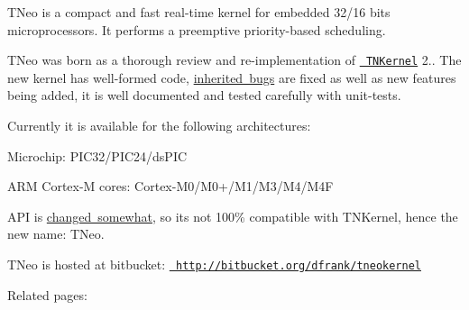 T\+Neo is a compact and fast real-\/time kernel for embedded 32/16 bits microprocessors. It performs a preemptive priority-\/based scheduling.

T\+Neo was born as a thorough review and re-\/implementation of \href{http://tnkernel.com}{\texttt{ T\+N\+Kernel}} 2.. The new kernel has well-\/formed code, \mbox{\hyperlink{why_reimplement_why_reimplement__bugs}{inherited bugs}} are fixed as well as new features being added, it is well documented and tested carefully with unit-\/tests.

Currently it is available for the following architectures\+:


\begin{DoxyItemize}
\item Microchip\+: P\+I\+C32/\+P\+I\+C24/ds\+P\+IC
\item A\+RM Cortex-\/M cores\+: Cortex-\/\+M0/\+M0+/\+M1/\+M3/\+M4/\+M4F
\end{DoxyItemize}

A\+PI is \mbox{\hyperlink{tnkernel_diff}{changed somewhat}}, so it\textquotesingle{}s not 100\% compatible with T\+N\+Kernel, hence the new name\+: T\+Neo.

T\+Neo is hosted at bitbucket\+: \href{http://bitbucket.org/dfrank/tneokernel}{\texttt{ http\+://bitbucket.\+org/dfrank/tneokernel}}

Related pages\+:


